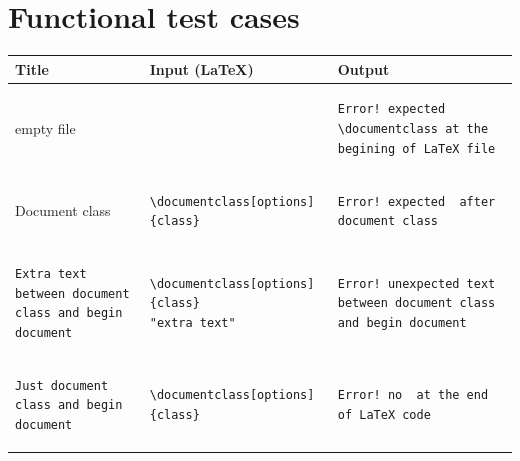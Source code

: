 \section{Functional test cases}

\begin{tabular}{|p{3cm}|p{6cm}|p{6cm}|}
    \hline 
    Title  &  Input (\LaTeX) & Output \\
    \hline

    empty file &
    \begin{lstlisting}

    \end{lstlisting}&
    \begin{lstlisting}
Error! expected \documentclass at the begining of LaTeX file 
    \end{lstlisting} \\
    \hline

    Document class &
    \begin{lstlisting}
\documentclass[options]{class}
    \end{lstlisting}&
    \begin{lstlisting}
Error! expected  after document class
    \end{lstlisting} \\
    \hline

    \begin{lstlisting}
Extra text between document class and begin document
    \end{lstlisting}&
    \begin{lstlisting}
\documentclass[options]{class}
"extra text"

    \end{lstlisting}&
    \begin{lstlisting}
Error! unexpected text between document class and begin document
    \end{lstlisting}  \\
    \hline 

\begin{lstlisting}
Just document class and begin document
\end{lstlisting}&
\begin{lstlisting}
\documentclass[options]{class}

\end{lstlisting}&
\begin{lstlisting}
Error! no  at the end of LaTeX code
\end{lstlisting}  \\
\hline 

    \end{tabular} 


